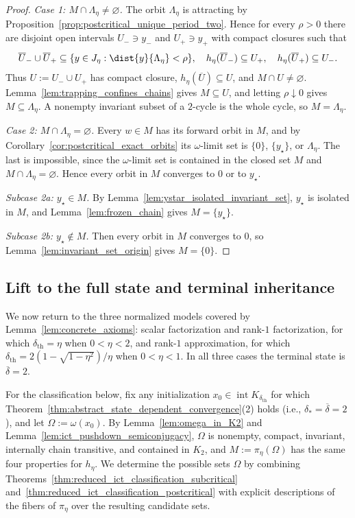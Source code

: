 \documentclass{article}
\begin{document}
\begin{proof}

\emph{Case 1: $M\cap\Lambda_\eta\ne\varnothing$.} The orbit $\Lambda_\eta$ is
attracting by Proposition~\ref{prop:postcritical_unique_period_two}. Hence for
every $\rho>0$ there are disjoint open intervals $U_-\ni y_-$ and
$U_+\ni y_+$ with compact closures such that
\begin{align}
    \overline U_-\cup\overline U_+
    \subseteq
    \{y\in J_\eta:\dist{y}{\Lambda_\eta}<\rho\},
    \quad
    h_\eta(\overline U_-)\subseteq U_+,
    \quad
    h_\eta(\overline U_+)\subseteq U_-.
\end{align}
Thus $U:=U_-\cup U_+$ has compact closure,
$h_\eta(\overline U)\subseteq U$, and $M\cap U\ne\varnothing$.
Lemma~\ref{lem:trapping_confines_chains} gives $M\subseteq U$, and letting
$\rho\downarrow0$ gives $M\subseteq\Lambda_\eta$. A nonempty invariant subset
of a $2$-cycle is the whole cycle, so $M=\Lambda_\eta$.

\emph{Case 2: $M\cap\Lambda_\eta=\varnothing$.} Every $w\in M$ has its forward
orbit in $M$, and by Corollary~\ref{cor:postcritical_exact_orbits} its
$\omega$-limit set is $\{0\}$, $\{y_\star\}$, or $\Lambda_\eta$. The last is
impossible, since the $\omega$-limit set is contained in the closed set $M$ and
$M\cap\Lambda_\eta=\varnothing$.
Hence every orbit in $M$ converges to $0$ or to
$y_\star$.

\emph{Subcase 2a: $y_\star\in M$.} By
Lemma~\ref{lem:ystar_isolated_invariant_set}, $y_\star$ is isolated in $M$, and
Lemma~\ref{lem:frozen_chain} gives $M=\{y_\star\}$.

\emph{Subcase 2b: $y_\star\notin M$.} Then every orbit in $M$ converges to $0$,
so Lemma~\ref{lem:invariant_set_origin} gives $M=\{0\}$.
\end{proof}

\subsection{Lift to the full state and terminal inheritance}
\label{subsec:full_state_lift}

We now return to the three normalized models covered by
Lemma~\ref{lem:concrete_axioms}: scalar factorization and rank-$1$
factorization, for which $\delta_{\mathrm{th}}=\eta$ when $0<\eta<2$, and
rank-$1$ approximation, for which
$\delta_{\mathrm{th}}=2(1-\sqrt{1-\eta^2})/\eta$ when $0<\eta<1$. In all
three cases the terminal state is $\overline\delta=2$.

For the classification below, fix any initialization
$x_0\in\operatorname{int}K_{\delta_{\mathrm{th}}}$ for which
Theorem~\ref{thm:abstract_state_dependent_convergence}(2) holds (i.e.,
$\delta_\ast=\overline\delta=2$), and let $\Omega:=\omega(x_0)$. By
Lemma~\ref{lem:omega_in_K2} and
Lemma~\ref{lem:ict_pushdown_semiconjugacy}, $\Omega$ is nonempty, compact,
invariant, internally chain transitive, and contained in $K_2$, and
$M:=\pi_\eta(\Omega)$ has the same four properties for $h_\eta$. We determine
the possible sets $\Omega$ by combining
Theorems~\ref{thm:reduced_ict_classification_subcritical}
and~\ref{thm:reduced_ict_classification_postcritical} with explicit descriptions
of the fibers of $\pi_\eta$ over the resulting candidate sets.
\end{document}
